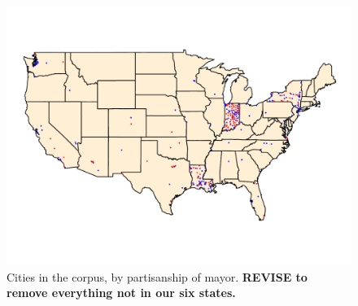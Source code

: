 \documentclass[11pt]{article}
\begin{document}
\begin{figure}[htp]
	\centering %
	\caption{Cities in the corpus, by partisanship of mayor. \textbf{REVISE to remove everything not in our six states.}}
	\label{us_map}
	\includegraphics[width=\linewidth]{figures/us_map.pdf}
\end{figure}









%
\end{document}
